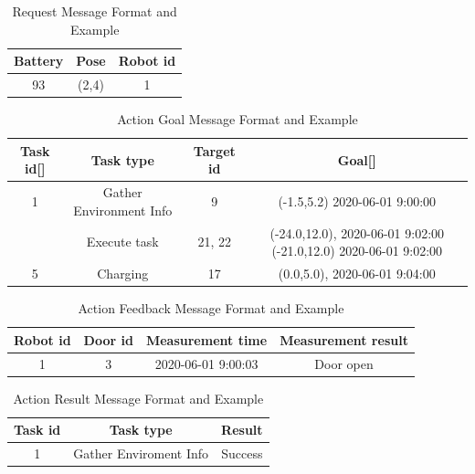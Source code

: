 \begin{table}[htb]
\centering
\begin{tabular}{|c|c|c|} 
\hline
Battery & Pose & Robot id\\
\hline\hline
93	&(2,4)	&1 \\ [1ex] 
\hline
\end{tabular}
\caption{Request Message Format and Example}
\label{tab:request_message}
\end{table}

\begin{table}[htb]
\centering
\begin{tabular}{|c|c|c|c|} 
\hline
Task id[] &Task type & Target id & Goal[] \\
\hline\hline
1& Gather Environment Info & 9	& (-1.5,5.2) 2020-06-01 9:00:00 \\
\hline
[3,4]	& Execute task & 21, 22	& (-24.0,12.0), 2020-06-01 9:02:00 (-21.0,12.0) 2020-06-01 9:02:00 \\
\hline
5	& Charging	& 17	&(0.0,5.0), 2020-06-01 9:04:00 \\ [1ex] 
\hline
\end{tabular}
\caption{Action Goal Message Format and Example}
\label{tab:goal_message}
\end{table}

\begin{table}[htb]
\centering
\begin{tabular}{|c|c|c|c|} 
\hline
Robot id & Door id & Measurement time & Measurement result \\
\hline\hline
1	& 3	& 2020-06-01 9:00:03 & Door open \\ [1ex] 
\hline
\end{tabular}
\caption{Action Feedback Message Format and Example}
\label{tab:feedback_message}
\end{table}

\begin{table}[htb]
\centering
\begin{tabular}{|c|c|c|} 
\hline
Task id	& Task type	& Result\\
\hline\hline
1 & Gather Enviroment Info & Success \\ [1ex] 
\hline
\end{tabular}
\caption{Action Result Message Format and Example}
\label{tab:result_message}
\end{table}


